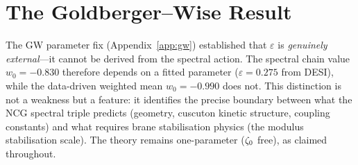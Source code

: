 \section{The Goldberger--Wise Result}
\label{app:val-gw-note}

The GW parameter fix (Appendix~\ref{app:gw}) established that $\varepsilon$ is \emph{genuinely external}---it cannot be derived from the spectral action. The spectral chain value $w_0 = -0.830$ therefore depends on a fitted parameter ($\varepsilon = 0.275$ from DESI), while the data-driven weighted mean $w_0 = -0.990$ does not. This distinction is not a weakness but a feature: it identifies the precise boundary between what the NCG spectral triple predicts (geometry, cuscuton kinetic structure, coupling constants) and what requires brane stabilisation physics (the modulus stabilisation scale). The theory remains one-parameter ($\zeta_0$ free), as claimed throughout.
